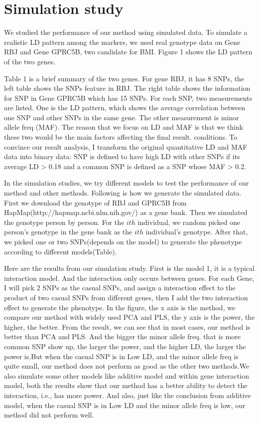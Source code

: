 \documentclass{article}
\begin{document}
    \section{Simulation study}
    
        We studied the performance of our method using simulated data. To simulate a realistic LD pattern among the markers, we used real genotype data on Gene RBJ and Gene GPRC5B, two candidate for BMI. Figure 1 shows the LD pattern of the two genes. 
        
        Table 1 is a brief summary of the two genes. For gene RBJ, it has 8 SNPs, the left table shows the SNPs feature in RBJ. The right table shows the information for SNP in Gene GPRC5B which has 15 SNPs. For each SNP, two measurements are listed. One is the LD pattern, which shows the average correlation between one SNP and other SNPs in the same gene. The other measurement is minor allele freq (MAF). The reason that we focus on LD and MAF is that we think these two would be the main factors affecting the final result. conditions. To convince our result analysis, I transform the original quantitative LD and MAF data into binary data: SNP is defined to have high LD with other SNPs if its average LD > 0.18 and a common SNP is defined as a SNP whose MAF > 0.2. 
        
        In the simulation studies, we try different models to test the performance of our method and other methods. Following is how we generate the simulated data. First we download the genotype of RBJ and GPRC5B from HapMap(http://hapmap.ncbi.nlm.nih.gov/) as a gene bank. Then we simulated the genotype person by person. For the $ith$ individual, we random picked one person's genotype in the gene bank as the $ith$ individual's genotype. After that, we picked one or two SNPs(depends on the model) to generate the phenotype according to different models(Table).
        
        Here are the results from our simulation study. First is the model 1, it is a typical interaction model. And the interaction only occurs between genes. For each Gene, I will pick 2 SNPs as the casual SNPs, and assign a interaction effect to the product of two casual SNPs from different genes, then I add the two interaction effect to generate the phenotype. In the figure, the x axis is the method, we compare our method with widely used PCA and PLS, the y axis is the power, the higher, the better. From the result, we can see that in most cases, our method is better than PCA and PLS. And the bigger the minor allele freq. that is more common SNP show up, the larger the power, and the higher LD, the larger the power is.But when the casual SNP is in Low LD, and the minor allele freq is quite small, our method does not perform as good as the other two methods.We also simulate some other models like additive model and within gene interaction model, both the results show that our method has a better ability to detect the interaction, i.e., has more power. And also, just like the conclusion from additive model, when the casual SNP is in Low LD and the minor allele freq is low, our method did not perform well.
\end{document}
